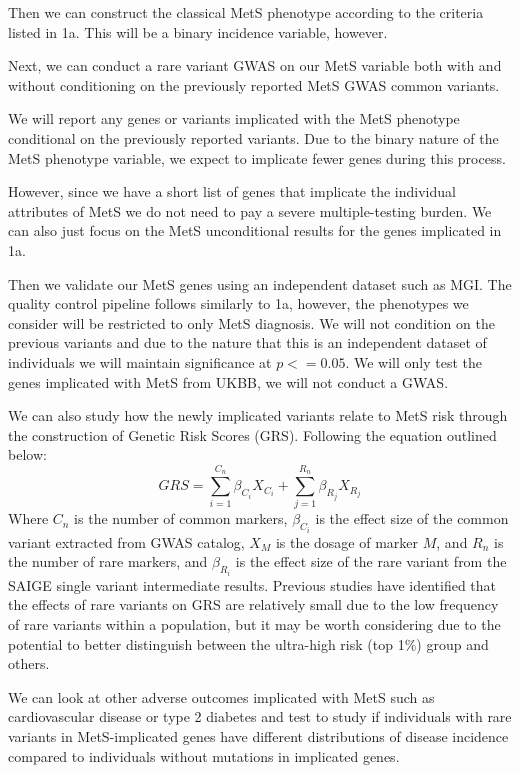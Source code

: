 \documentclass[11pt]{article}
\begin{document}
Then we can construct the classical MetS phenotype according to the criteria listed in 1a. This will be a binary incidence variable, however. 

Next, we can conduct a rare variant GWAS on our MetS variable both with and without conditioning on the previously reported MetS GWAS common variants.

We will report any genes or variants implicated with the MetS phenotype conditional on the previously reported variants. Due to the binary nature of the MetS phenotype variable, we expect to implicate fewer genes during this process.

However, since we have a short list of genes that implicate the individual attributes of MetS we do not need to pay a severe multiple-testing burden. We can also just focus on the MetS unconditional results for the genes implicated in 1a.

Then we validate our MetS genes using an independent dataset such as MGI. The quality control pipeline follows similarly to 1a, however, the phenotypes we consider will be restricted to only MetS diagnosis. We will not condition on the previous variants and due to the nature that this is an independent dataset of individuals we will maintain significance at $p <= 0.05$. We will only test the genes implicated with MetS from UKBB, we will not conduct a GWAS.

We can also study how the newly implicated variants relate to MetS risk through the construction of Genetic Risk Scores (GRS). Following the equation outlined below:
$$GRS = \sum_{i=1}^{C_n} \beta_{C_i}X_{C_i} + \sum_{j=1}^{R_n} \beta_{R_j}X_{R_j}$$
Where $C_n$ is the number of common markers, $\beta_{C_i}$ is the effect size of the common variant extracted from GWAS catalog, $X_M$ is the dosage of marker $M$, and $R_n$ is the number of rare markers, and $\beta_{R_i}$ is the effect size of the rare variant from the SAIGE single variant intermediate results. Previous studies have identified that the effects of rare variants on GRS are relatively small due to the low frequency of rare variants within a population, but it may be worth considering due to the potential to better distinguish between the ultra-high risk (top 1\%) group and others. 

We can look at other adverse outcomes implicated with MetS such as cardiovascular disease or type 2 diabetes and test to study if individuals with rare variants in MetS-implicated genes have different distributions of disease incidence compared to individuals without mutations in implicated genes. 
\end{document}
